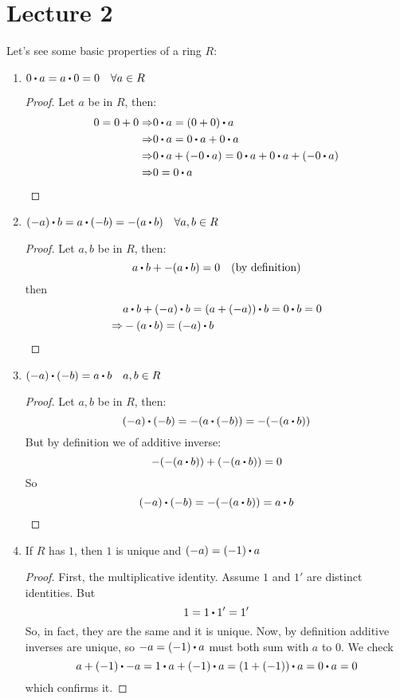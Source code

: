 \documentclass[../Main.tex]{subfiles}
\begin{document}
\chapter{Lecture 2}
Let's see some basic properties of a ring $R$:
\begin{enumerate}
	\item $0\rdot a= a\rdot 0=0 \quad \forall a \in R$
	\begin{proof}
		Let $a$ be in $R$, then:
		\begin{align*}
			0=0+0\Rightarrow & 0\rdot a = (0+0)\rdot a  \\
			\Rightarrow& 0 \rdot a= 0\rdot a + 0\rdot a   \\
			\Rightarrow& 0\rdot a +(-0\rdot a) = 0\rdot a + 0\rdot a + (-0\rdot a)  \\
			\Rightarrow& 0 = 0 \rdot a
		\end{align*}
	\end{proof}
	\item $(-a)\rdot b = a\rdot (-b) = -(a\rdot b) \quad \forall a,b \in R$
	\begin{proof}
		Let $a,b$ be in $R$, then:
		\[a\rdot b + -(a \rdot b) = 0 \quad \textrm{(by definition)}\]
		then
		\begin{align*}
			&a\rdot b +(-a)\rdot b = (a+(-a))\rdot b = 0\rdot b=0\\
			\Rightarrow& -(a\rdot b) = (-a)\rdot b
		\end{align*}
	\end{proof}
	\item $(-a)\rdot (-b)=a\rdot b \quad a,b \in R$
	\begin{proof}
		Let $a,b$ be in $R$, then:
		\[(-a)\rdot (-b) = - (a\rdot (-b)) = -(-(a\rdot b)) \]
		But by definition we of additive inverse:
			\[-(-(a\rdot b))+(-(a\rdot b))=0\]
		So
		\[(-a)\rdot (-b)=-(-(a\rdot b))=a\rdot b\]	
	\end{proof}
	\item If $R$ has $1$, then $1$ is unique and $(-a) = (-1)\rdot a$
	\begin{proof}
		First, the multiplicative identity. Assume $1$ and $1'$ are distinct identities. But
		\[1= 1\rdot 1'=1'\]
		So, in fact, they are the same and it is unique.\newline
		Now, by definition additive inverses are unique, so $-a = (-1)\rdot a$ must both sum with $a$ to $0$. We check 
		\[a+(-1)\rdot -a = 1\rdot a + (-1) \rdot  a = (1+(-1))\rdot a = 0\rdot a = 0\]
		which confirms it.
	\end{proof}
\end{enumerate}
\end{document}
